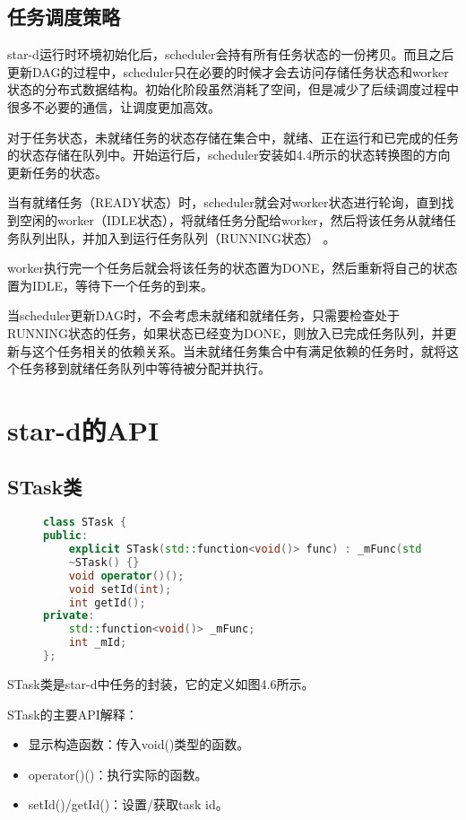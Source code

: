 \subsection{任务调度策略}

star-d运行时环境初始化后，scheduler会持有所有任务状态的一份拷贝。而且之后更新DAG的过程中，scheduler只在必要的时候才会去访问存储任务状态和worker状态的分布式数据结构。初始化阶段虽然消耗了空间，但是减少了后续调度过程中很多不必要的通信，让调度更加高效。

对于任务状态，未就绪任务的状态存储在集合中，就绪、正在运行和已完成的任务的状态存储在队列中。开始运行后，scheduler安装如4.4所示的状态转换图的方向更新任务的状态。

当有就绪任务（READY状态）时，scheduler就会对worker状态进行轮询，直到找到空闲的worker（IDLE状态），将就绪任务分配给worker，然后将该任务从就绪任务队列出队，并加入到运行任务队列（RUNNING状态） 。

worker执行完一个任务后就会将该任务的状态置为DONE，然后重新将自己的状态置为IDLE，等待下一个任务的到来。

当scheduler更新DAG时，不会考虑未就绪和就绪任务，只需要检查处于RUNNING状态的任务，如果状态已经变为DONE，则放入已完成任务队列，并更新与这个任务相关的依赖关系。当未就绪任务集合中有满足依赖的任务时，就将这个任务移到就绪任务队列中等待被分配并执行。

\section{star-d的API}

\subsection{STask类}

\begin{figure}[!htbp]
    \centering
\begin{lstlisting}[language=c++,caption={}]
class STask {
public:
    explicit STask(std::function<void()> func) : _mFunc(std::move(func)) {}
    ~STask() {}
    void operator()();
    void setId(int);
    int getId();
private:
    std::function<void()> _mFunc;
    int _mId;
};
\end{lstlisting}
    \label{fig:4_stask}
\end{figure}

STask类是star-d中任务的封装，它的定义如图4.6所示。

STask的主要API解释：

\begin{itemize}
	\item 显示构造函数：传入void()类型的函数。
	\item operator()()：执行实际的函数。
	\item setId()/getId()：设置/获取task id。
\end{itemize}

